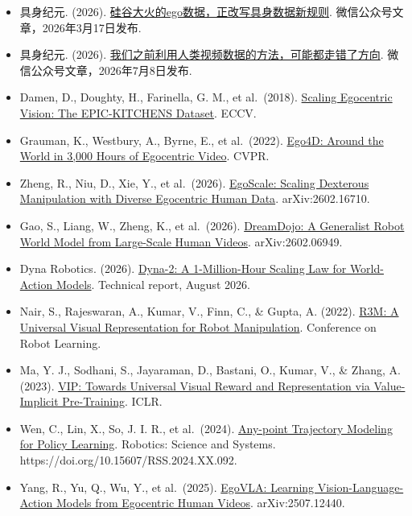 \vspace{0.25em}
\begin{itemize}
\tightlist
\item
  具身纪元. (2026). \href{https://www.jintiankansha.com/t/rxSAsq869K}{硅谷大火的ego数据，正改写具身数据新规则}. 微信公众号文章，2026年3月17日发布.
\item
  具身纪元. (2026). \href{https://www.jintiankansha.com/t/PtzdfzjSA4}{我们之前利用人类视频数据的方法，可能都走错了方向}. 微信公众号文章，2026年7月8日发布.
\item
  Damen, D., Doughty, H., Farinella, G. M., et al.~(2018). \href{https://arxiv.org/abs/1804.02748}{Scaling Egocentric Vision: The EPIC-KITCHENS Dataset}. ECCV.
\item
  Grauman, K., Westbury, A., Byrne, E., et al.~(2022). \href{https://arxiv.org/abs/2110.07058}{Ego4D: Around the World in 3,000 Hours of Egocentric Video}. CVPR.
\item
  Zheng, R., Niu, D., Xie, Y., et al.~(2026). \href{https://arxiv.org/abs/2602.16710}{EgoScale: Scaling Dexterous Manipulation with Diverse Egocentric Human Data}. arXiv:2602.16710.
\item
  Gao, S., Liang, W., Zheng, K., et al.~(2026). \href{https://arxiv.org/abs/2602.06949}{DreamDojo: A Generalist Robot World Model from Large-Scale Human Videos}. arXiv:2602.06949.
\item
  Dyna Robotics. (2026). \href{https://www.dyna.co/dyna-2}{Dyna-2: A 1-Million-Hour Scaling Law for World-Action Models}. Technical report, August 2026.
\item
  Nair, S., Rajeswaran, A., Kumar, V., Finn, C., \& Gupta, A. (2022). \href{https://arxiv.org/abs/2203.12601}{R3M: A Universal Visual Representation for Robot Manipulation}. Conference on Robot Learning.
\item
  Ma, Y. J., Sodhani, S., Jayaraman, D., Bastani, O., Kumar, V., \& Zhang, A. (2023). \href{https://arxiv.org/abs/2210.00030}{VIP: Towards Universal Visual Reward and Representation via Value-Implicit Pre-Training}. ICLR.
\item
  Wen, C., Lin, X., So, J. I. R., et al.~(2024). \href{https://www.roboticsproceedings.org/rss20/p092.html}{Any-point Trajectory Modeling for Policy Learning}. Robotics: Science and Systems. https://doi.org/10.15607/RSS.2024.XX.092.
\item
  Yang, R., Yu, Q., Wu, Y., et al.~(2025). \href{https://arxiv.org/abs/2507.12440}{EgoVLA: Learning Vision-Language-Action Models from Egocentric Human Videos}. arXiv:2507.12440.

\end{itemize}
